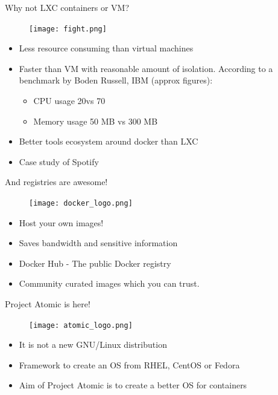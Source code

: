 \documentclass{beamer}
\begin{document}
\begin{frame}{Why not LXC containers or VM?}
\begin{figure}[htp]
\centering
\texttt{[image: fight.png]}
\label{}
\end{figure}
\begin{itemize}
  \item Less resource consuming than virtual machines
  \item Faster than VM with reasonable amount of isolation. According to a benchmark by Boden Russell, IBM (approx figures):
  \begin{itemize}
    \item CPU usage 20\percent vs 70\percent
    \item Memory usage 50 MB vs 300 MB
  \end{itemize}    
  \item Better tools ecosystem around docker than LXC
  \item Case study of Spotify
\end{itemize}
\end{frame}

\begin{frame}{And registries are awesome!}
\begin{figure}[htp]
\centering
\texttt{[image: docker\_logo.png]}
\label{}
\end{figure}
\begin{itemize}
  \item Host your own images!
  \item Saves bandwidth and sensitive information
  \item Docker Hub - The public Docker registry
  \item Community curated images which you can trust. 
\end{itemize}
\end{frame}

\begin{frame}{Project Atomic is here!}
\begin{figure}[htp]
\centering
\texttt{[image: atomic\_logo.png]}
\label{}
\end{figure}
\begin{itemize}
  \item It is not a new GNU/Linux distribution
  \item Framework to create an OS from RHEL, CentOS or Fedora
  \item Aim of Project Atomic is to create a better OS for containers
\end{itemize}
\end{frame}
\end{document}
